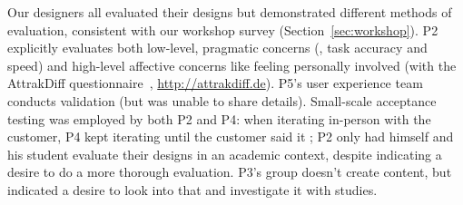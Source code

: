 




Our designers all evaluated their designs but demonstrated different methods of evaluation, consistent with our workshop survey (Section~\ref{sec:workshop}).
P2 explicitly evaluates both low-level, pragmatic concerns (\eg, task accuracy and speed) and high-level affective concerns like feeling personally involved (with the AttrakDiff questionnaire~\citep{Hassenzahl2003}, \url{http://attrakdiff.de}).
P5's user experience team conducts validation (but was unable to share details). %
Small-scale acceptance testing was employed by both P2 and P4: when iterating in-person with the customer, P4 kept iterating until the customer said it ; P2 only had himself and his student evaluate their designs in an academic context, despite indicating a desire to do a more thorough evaluation.
P3's group doesn't create content, but indicated a desire to look into that and investigate it with studies.


